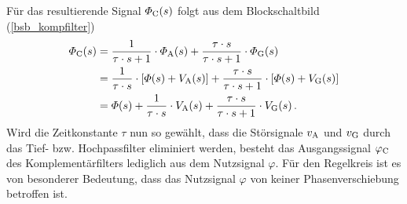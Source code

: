 Für das resultierende Signal $\varPhi_{\text{C}}(s)$ folgt aus dem Blockschaltbild (\ref{bsb_kompfilter})
\begin{equation}
\begin{split}
\varPhi_{\text{C}}(s) &= \frac{1}{\tau \cdot s + 1}\cdot \varPhi_{\text{A}}(s) + \frac{\tau \cdot s}{\tau\cdot s + 1}\cdot \varPhi_{\text{G}}(s)
\\
&= \frac{1}{\tau\cdot s}\cdot \left[\varPhi(s) + V_{\text{A}}(s)\right] + \frac{\tau\cdot s}{\tau\cdot s + 1}\cdot \left[\varPhi(s) + V_{\text{G}}(s)\right]
\\
&= \varPhi(s) + \frac{1}{\tau\cdot s}\cdot V_{\text{A}}(s) + \frac{\tau\cdot s}{\tau\cdot s + 1}\cdot V_{\text{G}}(s) \,.
\end{split}
\end{equation}
Wird die Zeitkonstante $\tau$ nun so gewählt, dass die Störsignale $v_{\text{A}}$ und $v_{\text{G}}$ durch das Tief- bzw. Hochpassfilter eliminiert werden, besteht das Ausgangssignal $\varphi_{\text{C}}$ des Komplementärfilters lediglich aus dem Nutzsignal $\varphi$. Für den Regelkreis ist es von besonderer Bedeutung, dass das Nutzsignal $\varphi$ von keiner Phasenverschiebung betroffen ist.

